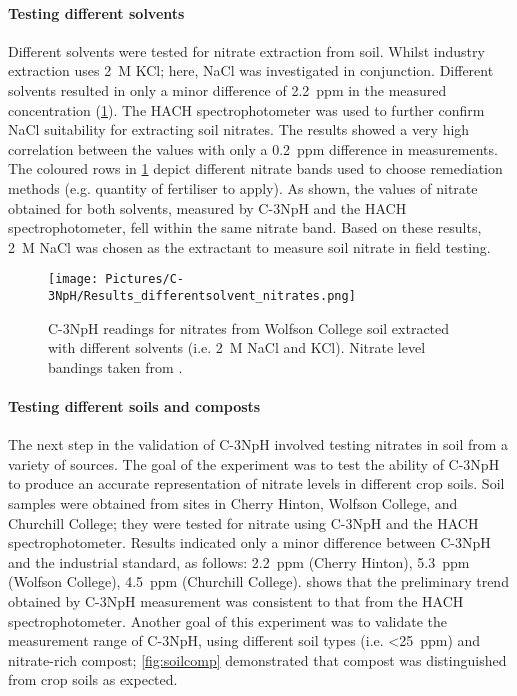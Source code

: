 \paragraph{Testing different solvents}
Different solvents were tested for nitrate extraction from soil. Whilst industry extraction uses \SI{2}{M} KCl; here, NaCl was investigated in conjunction. Different solvents resulted in only a minor difference of \SI{2.2}{ppm} in the measured concentration (\cref{fig:diffsolv_nitrate}). The HACH spectrophotometer was used to further confirm NaCl suitability for extracting soil nitrates. The results showed a very high correlation between the values with only a \SI{0.2}{ppm} difference in measurements. The coloured rows in \cref{fig:diffsolv_nitrate} depict different nitrate bands used to choose remediation methods (e.g. quantity of fertiliser to apply). As shown, the values of nitrate obtained for both solvents, measured by C-3NpH and the HACH spectrophotometer, fell within the same nitrate band. Based on these results, \SI{2}{M} NaCl was chosen as the extractant to measure soil nitrate in field testing.


\begin{figure}[h!]
	\centering
	\texttt{[image: Pictures/C-3NpH/Results\_differentsolvent\_nitrates.png]}
		\captionsetup{justification = centering}
	\caption{C-3NpH readings for nitrates from Wolfson College soil extracted with different solvents (i.e. \SI{2}{M} NaCl and KCl). Nitrate level bandings taken from \cite{Pattison2010}.}
	\label{fig:diffsolv_nitrate}
\end{figure}

\paragraph{Testing different soils and composts} 
The next step in the validation of C-3NpH involved testing nitrates in soil from a variety of sources. The goal of the experiment was to test the ability of C-3NpH to produce an accurate representation of nitrate levels in different crop soils.
Soil samples were obtained from sites in Cherry Hinton, Wolfson College, and Churchill College; they were tested for nitrate using C-3NpH and the HACH spectrophotometer. Results indicated only a minor difference between C-3NpH and the industrial standard, as follows: \SI{2.2}{ppm} (Cherry Hinton), \SI{5.3}{ppm} (Wolfson College), \SI{4.5}{ppm} (Churchill College).  shows that the preliminary trend obtained by C-3NpH measurement was consistent to that from the HACH spectrophotometer. 
Another goal of this experiment was to validate the measurement range of C-3NpH, using different soil types (i.e. \SI{<25}{ppm}) and nitrate-rich compost; \cref{fig:soilcomp} demonstrated that compost was distinguished from crop soils as expected.

